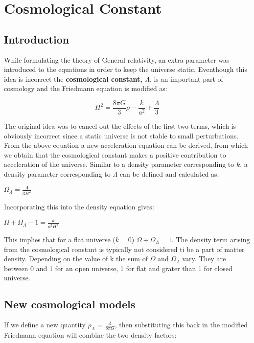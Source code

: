 \documentclass{article}
\begin{document}
\section{Cosmological Constant}
\subsection{Introduction}
While formulating the theory of General relativity, an extra parameter was introduced to the equations in order to keep the universe static. Eventhough this idea is incorrect the \textbf{cosmological constant, $\Lambda$}, is an important part of cosmology and the Friedmann equation is modified as:

\begin{equation}
    H^2 = \frac{8\pi{G}}{3}\rho - \frac{k}{a^2} + \frac{\Lambda}{3}
\end{equation}

The original idea was to cancel out the effects of the first two terms, which is obviously incorrect since a static universe is not stable to small perturbations. From the above equation a new acceleration equation can be derived, from which we obtain that the cosmological constant makes a positive contribution to acceleration of the universe. Similar to a density parameter corresponding to $k$, a density parameter corresponding to $\Lambda$ can be defined and calculated as:

\begin{center}
    $\Omega_{\Lambda} = \frac{\Lambda}{3H^2}$
\end{center}

Incorporating this into the density equation gives:

\begin{center}
    $\Omega+\Omega_{\Lambda}-1 = \frac{k}{a^2H^2}$
\end{center}

This implies that for a flat universe ($k=0$) \textbf{$\Omega+\Omega_{\Lambda}=1$}. The density term arising from the cosmological constant is typically not considered ti be a part of matter density. Depending on the value of k the sum of $\Omega$ and $\Omega_{\Lambda}$ vary. They are between 0 and 1 for an open universe, 1 for flat and grater than 1 for closed universe.

\subsection{New cosmological models}
If we define a new quantity \textbf{$\rho_{\Lambda}$} = $\frac{\Lambda}{8\pi{G}}$, then substituting this back in the modified Friedmann equation will combine the two density factors:
\end{document}
